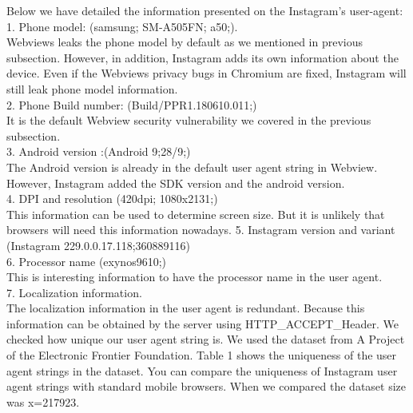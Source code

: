 Below we have detailed the information presented on the Instagram's user-agent:\\
1. Phone model: (samsung; SM-A505FN; a50;).\\
Webviews leaks the phone model by default as we mentioned in previous subsection. However, in addition, Instagram adds its own information about the device. Even if the Webviews privacy bugs in Chromium are fixed, Instagram will still leak phone model information.\\
2.  Phone Build number: (Build/PPR1.180610.011;)\\
It is the default Webview security vulnerability we covered in the previous subsection.\\
3. Android version :(Android 9;28/9;) \\
The Android version is already in the default user agent string in Webview. However, Instagram added the SDK version and the android version.\\
4. DPI and resolution (420dpi; 1080x2131;)\\
This information can be used to determine screen size. But it is unlikely that browsers will need this information nowadays.
5. Instagram version and variant (Instagram 229.0.0.17.118;360889116)\\
6. Processor name (exynos9610;)\\
This is interesting information to have the processor name in the user agent.\\
7. Localization information. \\
The localization information in the user agent is redundant. Because this information can be obtained by the server using HTTP\_ACCEPT\_Header.
We checked how unique our user agent string is. We used the dataset from A Project of the Electronic Frontier Foundation\cite{tracks}. Table 1 shows the uniqueness of the user agent strings in the dataset. You can compare the uniqueness of Instagram user agent strings with standard mobile browsers.
When we compared the dataset size was x=217923.

